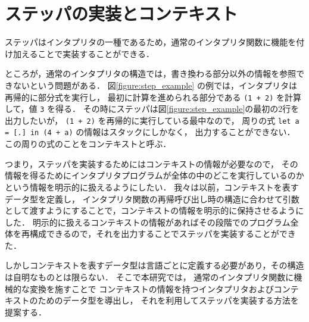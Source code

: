 \section{ステッパの実装とコンテキスト}
\label{section:context}

ステッパはインタプリタの一種であるため，通常のインタプリタ関数に機能を付け加えることで実装することができる．

ところが，通常のインタプリタの構造では，書き換わる部分以外の情報を参照できないという問題がある．
図\ref{figure:step_example} の例では，インタプリタは再帰的に部分式を実行し，
最初に計算を進められる部分である \texttt{(1 + 2)} を計算して，値 \texttt{3} を得る．
その時にステッパは図\ref{figure:step_example}の最初の2行を出力したいが，
\texttt{(1 + 2)} を再帰的に実行している最中なので，
周りの式 \texttt{let a = [.]\ in (4 + a)} の情報はスタックにしかなく，
出力することができない．
この周りの式のことをコンテキストと呼ぶ．

つまり，ステッパを実装するためにはコンテキストの情報が必要なので，
その情報を得るためにインタプリタプログラムが全体の中のどこを実行しているのかという情報を明示的に扱えるようにしたい．
我々は以前\cite{FCA19}，コンテキストを表すデータ型を定義し，
インタプリタ関数の再帰呼び出し時の構造に合わせて引数として渡すようにすることで，コンテキストの情報を明示的に保持させるようにした．
明示的に扱えるコンテキストの情報があればその段階でのプログラム全体を再構成できるので，それを出力することでステッパを実装することができた．

しかしコンテキストを表すデータ型は言語ごとに定義する必要があり，その構造は自明なものとは限らない．
そこで本研究では，
通常のインタプリタ関数に機械的な変換を施すことで
コンテキストの情報を持つインタプリタおよびコンテキストのためのデータ型を導出し，
それを利用してステッパを実装する方法を提案する．
